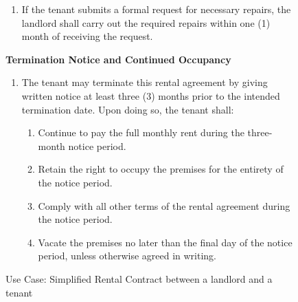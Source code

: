 \begin{example}
\begin{figure}[h!]
{\begin{minipage}{0.95\textwidth}
\begin{enumerate}
            \item[(C4)] If the tenant submits a formal request for necessary repairs, the landlord shall carry out the required repairs within one (1) month of receiving the request.

        \end{enumerate}

        

        \vspace{0.5em}

        \textbf{Termination Notice and Continued Occupancy}

        \begin{enumerate}

            \item[(C5)] The tenant may terminate this rental agreement by giving written notice at least three (3) months prior to the intended termination date. Upon doing so, the tenant shall:

            \begin{enumerate}

                \item[(i)] Continue to pay the full monthly rent during the three-month notice period.

                \item[(ii)] Retain the right to occupy the premises for the entirety of the notice period.

                \item[(iii)] Comply with all other terms of the rental agreement during the notice period.

                \item[(iv)] Vacate the premises no later than the final day of the notice period, unless otherwise agreed in writing.

            \end{enumerate}

        \end{enumerate}

    \end{minipage}

    }

    \caption{Use Case: Simplified Rental Contract between a landlord and a tenant}

    \label{fig:ucd}

   \end{figure}

\end{example}

